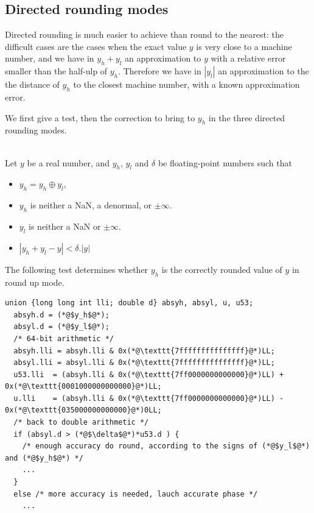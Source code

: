 \subsection{Directed rounding modes}

Directed rounding is much easier to achieve than round to the nearest:
the difficult cases are the cases when the exact value $y$ is very
close to a machine number, and we have in $y_h+y_l$ an approximation to
$y$ with a relative error smaller than the half-ulp of $y_h$.
Therefore we have in $|y_l|$ an approximation to the the distance of
$y_h$ to the closest machine number, with a known approximation error.

We first give a test, then the correction to bring to $y_h$ in the
three directed rounding modes.
\begin{theorem}
\label{th:roundingDirected}
~\\
Let $y$ be a real number, and $y_h$, $y_l$ and $\delta$ be
floating-point numbers such that
  \begin{itemize}
  \item $y_h=y_h\oplus y_l$,
  \item $y_h$ is neither a NaN, a denormal, or $\pm \infty$.
  \item $y_l$ is neither a NaN or $\pm \infty$.
  \item $|y_h+y_l - y| < \delta.|y|$
\end{itemize}

The following test determines whether $y_h$ is the
  correctly rounded value of $y$ in round up mode.

\begin{lstlisting}[caption={Test for directed rounding},
  firstnumber=1]
  union {long long int lli; double d} absyh, absyl, u, u53;
  absyh.d = (*@$y_h$@*);
  absyl.d = (*@$y_l$@*);
  /* 64-bit arithmetic */
  absyh.lli = absyh.lli & 0x(*@\texttt{7fffffffffffffff}@*)LL;
  absyl.lli = absyl.lli & 0x(*@\texttt{7fffffffffffffff}@*)LL;
  u53.lli  = (absyh.lli & 0x(*@\texttt{7ff0000000000000}@*)LL) + 0x(*@\texttt{0001000000000000}@*)LL;
  u.lli    = (absyh.lli & 0x(*@\texttt{7ff0000000000000}@*)LL) - 0x(*@\texttt{035000000000000}@*)0LL;
  /* back to double arithmetic */
  if (absyl.d > (*@$\delta$@*)*u53.d ) {
    /* enough accuracy do round, according to the signs of (*@$y_l$@*) and (*@$y_h$@*) */
    ...
  }
  else /* more accuracy is needed, lauch accurate phase */
    ...
\end{lstlisting}
\end{theorem}

